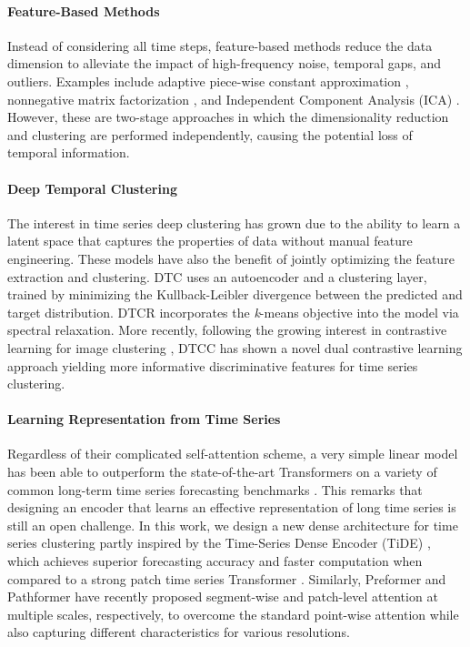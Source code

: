 \documentclass[times, review, 10pt]{elsarticle}
\begin{document}
\paragraph{Feature-Based Methods} Instead of considering all time steps, feature-based methods reduce the data dimension to alleviate the impact of high-frequency noise, temporal gaps, and outliers. Examples include adaptive piece-wise constant approximation \cite{keogh2001locally}, nonnegative matrix factorization \cite{brockwell1991time}, and Independent Component Analysis (ICA) \cite{guo2008time}. However, these are two-stage approaches in which the dimensionality reduction and clustering are performed independently, causing the potential loss of temporal information.

\paragraph{Deep Temporal Clustering} The interest in time series deep clustering has grown due to the ability to learn a latent space that captures the properties of data without manual feature engineering. These models have also the benefit of jointly optimizing the feature extraction and clustering. DTC \cite{madiraju2018deep} uses an autoencoder and a clustering layer, trained by minimizing the Kullback-Leibler divergence between the predicted and target distribution. DTCR \cite{ma2019learning} incorporates the \textit{k}-means objective into the model via spectral relaxation. More recently, following the growing interest in contrastive learning for image clustering \cite{deng2023strongly,peng2022crafting}, DTCC \cite{zhong2023deep} has shown a novel dual contrastive learning approach yielding more informative discriminative features for time series clustering.

\paragraph{Learning Representation from Time Series} Regardless of their complicated self-attention scheme, a very simple linear model \cite{zeng2023transformers} has been able to outperform the state-of-the-art Transformers on a variety of common long-term time series forecasting benchmarks \cite{misc_electricityloaddiagrams20112014_321,lai2018modeling}. This remarks that designing an encoder that learns an effective representation of long time series is still an open challenge. In this work, we design a new dense architecture for time series clustering partly inspired by the Time-Series Dense Encoder (TiDE) \cite{daslong}, which achieves superior forecasting accuracy and faster computation when compared to a strong patch time series Transformer \cite{Yuqietal-2023-PatchTST}. Similarly, Preformer \cite{du2023preformer} and Pathformer \cite{chenpathformer} have recently proposed segment-wise and patch-level attention at multiple scales, respectively, to overcome the standard point-wise attention while also capturing different characteristics for various resolutions.
\end{document}
